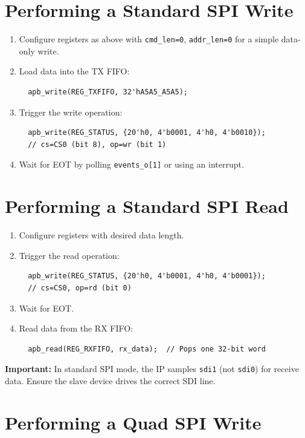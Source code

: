 \section{Performing a Standard SPI Write}

\begin{enumerate}[leftmargin=2em]
  \item Configure registers as above with \texttt{cmd\_len=0}, \texttt{addr\_len=0} for a simple data-only write.
  \item Load data into the TX FIFO:
  \begin{lstlisting}
  apb_write(REG_TXFIFO, 32'hA5A5_A5A5);
  \end{lstlisting}
  \item Trigger the write operation:
  \begin{lstlisting}
  apb_write(REG_STATUS, {20'h0, 4'b0001, 4'h0, 4'b0010});
  // cs=CS0 (bit 8), op=wr (bit 1)
  \end{lstlisting}
  \item Wait for EOT by polling \texttt{events\_o[1]} or using an interrupt.
\end{enumerate}

\section{Performing a Standard SPI Read}

\begin{enumerate}[leftmargin=2em]
  \item Configure registers with desired data length.
  \item Trigger the read operation:
  \begin{lstlisting}
  apb_write(REG_STATUS, {20'h0, 4'b0001, 4'h0, 4'b0001});
  // cs=CS0, op=rd (bit 0)
  \end{lstlisting}
  \item Wait for EOT.
  \item Read data from the RX FIFO:
  \begin{lstlisting}
  apb_read(REG_RXFIFO, rx_data);  // Pops one 32-bit word
  \end{lstlisting}
\end{enumerate}

\textbf{Important:} In standard SPI mode, the IP samples \texttt{sdi1} (not \texttt{sdi0}) for
receive data. Ensure the slave device drives the correct SDI line.

\section{Performing a Quad SPI Write}

